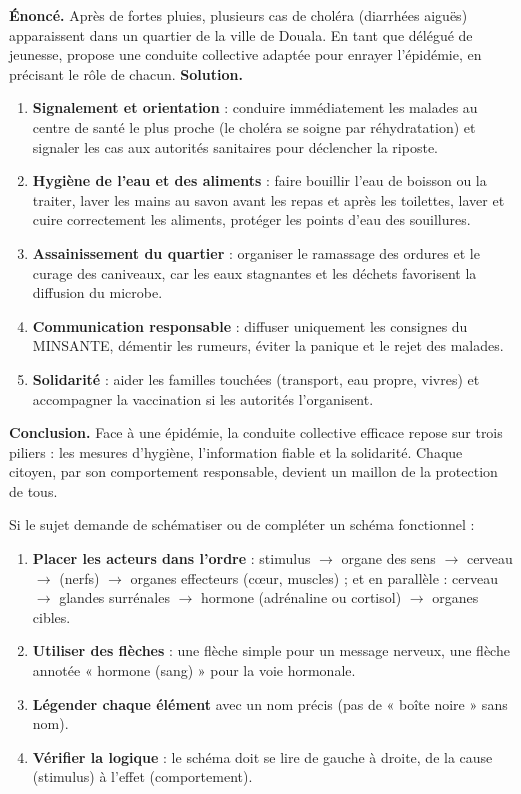 \documentclass[11pt]{article}
\newcommand{\cle}[1]{{\popxbold\color{popdark}#1}}
\begin{document}
\begin{exoresolu}
\textbf{Énoncé.} Après de fortes pluies, plusieurs cas de choléra (diarrhées aiguës) apparaissent dans un quartier de la ville de Douala. En tant que délégué de jeunesse, propose une conduite collective adaptée pour enrayer l'épidémie, en précisant le rôle de chacun.
\tcblower
\textbf{Solution.}
\begin{enumerate}
\item \textbf{Signalement et orientation} : conduire immédiatement les malades au centre de santé le plus proche (le choléra se soigne par réhydratation) et signaler les cas aux autorités sanitaires pour déclencher la riposte.
\item \textbf{Hygiène de l'eau et des aliments} : faire bouillir l'eau de boisson ou la traiter, laver les mains au savon avant les repas et après les toilettes, laver et cuire correctement les aliments, protéger les points d'eau des souillures.
\item \textbf{Assainissement du quartier} : organiser le ramassage des ordures et le curage des caniveaux, car les eaux stagnantes et les déchets favorisent la diffusion du microbe.
\item \textbf{Communication responsable} : diffuser uniquement les consignes du MINSANTE, démentir les rumeurs, éviter la panique et le rejet des malades.
\item \textbf{Solidarité} : aider les familles touchées (transport, eau propre, vivres) et accompagner la vaccination si les autorités l'organisent.
\end{enumerate}
\textbf{Conclusion.} Face à une épidémie, la conduite collective efficace repose sur trois piliers : les \cle{mesures d'hygiène}, l'\cle{information fiable} et la \cle{solidarité}. Chaque citoyen, par son comportement responsable, devient un maillon de la protection de tous.
\end{exoresolu}

\begin{methode}
Si le sujet demande de schématiser ou de compléter un schéma fonctionnel :
\begin{enumerate}
\item \textbf{Placer les acteurs dans l'ordre} : stimulus $\rightarrow$ organe des sens $\rightarrow$ cerveau $\rightarrow$ (nerfs) $\rightarrow$ organes effecteurs (cœur, muscles) ; et en parallèle : cerveau $\rightarrow$ glandes surrénales $\rightarrow$ hormone (adrénaline ou cortisol) $\rightarrow$ organes cibles.
\item \textbf{Utiliser des flèches} : une flèche simple pour un message nerveux, une flèche annotée « hormone (sang) » pour la voie hormonale.
\item \textbf{Légender chaque élément} avec un nom précis (pas de « boîte noire » sans nom).
\item \textbf{Vérifier la logique} : le schéma doit se lire de gauche à droite, de la cause (stimulus) à l'effet (comportement).
\end{enumerate}
\end{methode}
\end{document}

